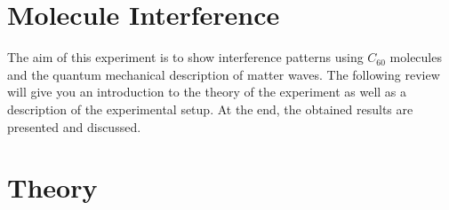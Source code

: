 \documentclass[12pt,a4paper]{article}
\begin{document}

\pagebreak

\setlength{\columnsep}{20pt}
\begin{multicols}{2}

\begin{abstract}

\end{abstract}


%

\section{Molecule Interference}
The aim of this experiment is to show interference patterns using $C_{60}$ molecules and the quantum mechanical description of matter waves. The following review will give you an introduction to the theory of the experiment as well as a description of the experimental setup. At the end, the obtained results are presented and discussed.


\section{Theory}


\end{multicols}
\end{document}
